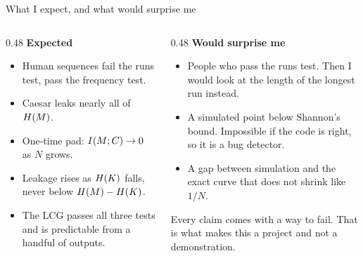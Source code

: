\documentclass[10pt,aspectratio=169]{beamer}
\begin{document}
\begin{frame}{What I expect, and what would surprise me}
  \begin{columns}[T]
    \begin{column}{0.48\textwidth}
      \textbf{Expected}
      \begin{itemize}
        \item Human sequences fail the runs test, pass the frequency
              test.
        \item Caesar leaks nearly all of $H\!\left(M\right)$.
        \item One-time pad: $I\!\left(M ; C\right) \to 0$ as $N$ grows.
        \item Leakage rises as $H\!\left(K\right)$ falls, never below
              $H\!\left(M\right) - H\!\left(K\right)$.
        \item The LCG passes all three tests and is predictable from a
              handful of outputs.
      \end{itemize}
    \end{column}
    \begin{column}{0.48\textwidth}
      \textbf{Would surprise me}
      \begin{itemize}
        \item People who pass the runs test. Then I would look at the
              length of the longest run instead.
        \item A simulated point below Shannon's bound. Impossible if
              the code is right, so it is a bug detector.
        \item A gap between simulation and the exact curve that does
              not shrink like $1/N$.
      \end{itemize}
      \medskip
      Every claim comes with a way to fail. That is what makes this a
      project and not a demonstration.
    \end{column}
  \end{columns}
\end{frame}
\end{document}
